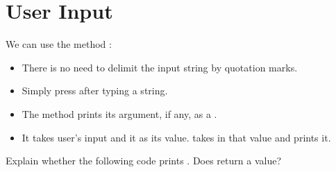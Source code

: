\documentclass[letterpaper,10pt,english]{sphinxmanual}
\begin{document}
\section{User Input}
\label{\detokenize{Lecture2/Values and Variables:user-input}}

We can use the method :
\begin{itemize}
\item {} 
There is no need to delimit the input string by quotation marks.

\item {} 
Simply press  after typing a string.

\end{itemize}

\begin{sphinxVerbatim}[commandchars=\\\{\}]
 
\end{sphinxVerbatim}
\begin{itemize}
\item {} 
The  method prints its argument, if any, as a .

\item {} 
It takes user’s input and  it as its value.  takes in that value and prints it.

\end{itemize}

 Explain whether the following code prints . Does  return a value?

\begin{sphinxVerbatim}[commandchars=\\\{\}]
 
\end{sphinxVerbatim}
\end{document}
